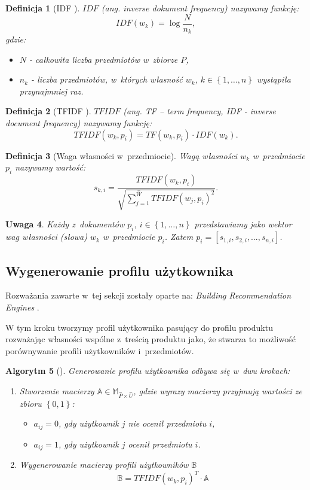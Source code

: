 \documentclass[12pt,a4paper]{report}
\newtheorem{df}{Definicja}[chapter]
\newtheorem{algorytm}[df]{Algorytm}
\newtheorem{uwaga}[df]{Uwaga}
\newcommand{\set}[1]{\left\lbrace {#1} \right\rbrace}
\newcommand{\setUzytkownicy}{\mathit{U}}
\newcommand{\setPrzedmioty}{\mathit{P}}
\begin{document}
\begin{df}[IDF {\citep[Sec 3.3.1.1]{rsh}}]
$IDF$ (ang. \textit{inverse dokument frequency}) nazywamy funkcję:
$$
IDF(w_k) = \log \frac{N}{n_k},
$$
gdzie:
\begin{itemize}
\item $N$ - całkowita liczba przedmiotów w~zbiorze $\setPrzedmioty$,
\item $n_k$ - liczba przedmiotów, w~których własność $w_k$, $k \in \set{1, \ldots, n}$ wystąpiła przynajmniej raz.
\end{itemize}
\end{df}

\begin{df}[TFIDF {\citep[Sec 3.3.1.1]{rsh}}]
$TFIDF$ (ang. \textit{TF – term frequency, IDF - inverse document frequency}) nazywamy funkcję:
$$
TFIDF(w_k, p_i) = TF(w_k, p_i) \cdot IDF(w_k).
$$
\end{df}

\begin{df}[Waga własności w~przedmiocie]
Wagą własności $w_k$ w~przedmiocie $p_i$ nazywamy wartość:
$$
s_{k,i} = \frac{TFIDF(w_k, p_i)}{\sqrt{ \sum_{j=1}^{\stackrel{=}{\mathit{W}}}{TFIDF(w_j, p_i)}^2}}.
$$
\end{df}

\begin{uwaga}
Każdy z~dokumentów $p_i, \: i\in\set{1,\ldots,n} $ przedstawiamy jako wektor wag własności (słowa) $w_k$ w~przedmiocie $p_i$. Zatem $ p_i = [s_{1,i}, s_{2,i},...,s_{n,i}] $.
\end{uwaga}


\subsection{Wygenerowanie profilu użytkownika}
Rozważania zawarte w~tej sekcji zostały oparte na: \textit{Building Recommendation Engines} {\citep[Sec 3]{bre}}.

W tym kroku tworzymy profil użytkownika pasujący do profilu produktu rozważając własności wspólne z~treścią produktu jako, że stwarza to możliwość porównywanie profili użytkowników i~przedmiotów.

\begin{algorytm}[{\citep[Sec 3]{bre}}]
Generowanie profilu użytkownika odbywa się w~dwu krokach:
\begin{enumerate}
\item Stworzenie macierzy $\mathbb{A} \in \mathbb{M}_{\stackrel{=}{\setPrzedmioty} \times \stackrel{=}{\setUzytkownicy} }$, gdzie wyrazy macierzy przyjmują wartości ze zbioru $\set{0,1}$:
\begin{itemize}
\item $a_{ij} = 0$, gdy użytkownik $j$ nie ocenił przedmiotu $i$,
\item $a_{ij} = 1$, gdy użytkownik $j$ ocenił przedmiotu $i$.
\end{itemize}
\item Wygenerowanie macierzy profili użytkowników $\mathbb{B}$
$$
\mathbb{B} = TFIDF(w_k, p_i)^T \cdot \mathbb{A}
$$
\end{enumerate} 

\end{algorytm}
\bigskip
\bigskip
\bigskip
\end{document}
